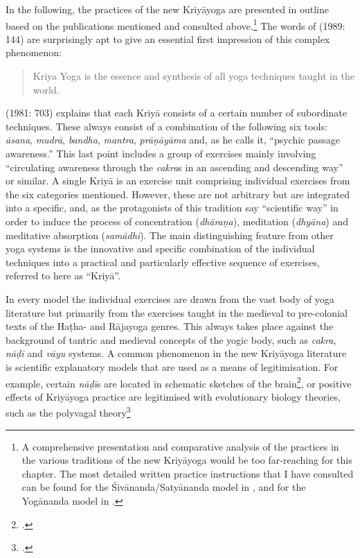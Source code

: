 In the following, the practices of the new Kriyāyoga are presented in outline based on the publications mentioned and consulted above.\footnote{A comprehensive presentation and comparative analysis of the practices in the various traditions of the new Kriyāyoga would be too far-reaching for this chapter. The most detailed written practice instructions that I have consulted can be found for the Śivānanda/Satyānanda model in \citeauthor[1981: 697-952]{kriyayogasarasvati1981}, and for the Yogānanda model in \citeauthor[2013: 249-340]{kriyayoganityananda2013}.} The words of \citeauthor{hariharananda1989} (1989: 144) are surprisingly apt to give an essential first impression of this complex phenomenon: \begin{quote} Kriya Yoga is the essence and synthesis of all yoga techniques taught in the world.  \end{quote} 
\citeauthor{kriyayogasarasvati1981} (1981: 703) explains that each Kriyā consists of a certain number of subordinate techniques. These always consist of a combination of the following six tools: \textit{āsana}, \textit{mudrā}, \textit{bandha}, \textit{mantra}, \textit{prāṇāyāma} and, as he calls it, ``psychic passage awareness.'' This last point includes a group of exercises mainly involving ``circulating awareness through the \textit{cakra}s in an ascending and descending way'' or similar. A single Kriyā is an exercise unit comprising individual exercises from the six categories mentioned. However, these are not arbitrary but are integrated into a specific, and, as the protagonists of this tradition say ``scientific way'' in order to induce the process of concentration (\textit{dhāraṇa}), meditation (\textit{dhyāna}) and meditative absorption (\textit{samādhi}). The main distinguishing feature from other yoga systems is the innovative and specific combination of the individual techniques into a practical and particularly effective sequence of exercises, referred to here as ``Kriyā''.

In every model the individual exercises are drawn from the vast body of yoga literature but primarily from the exercises taught in the medieval to pre-colonial texts of the Haṭha- and Rājayoga genres. This always takes place against the background of tantric and medieval concepts of the yogic body, such as \textit{cakra}, \textit{nāḍī} and \textit{vāyu} systems. A common phenomenon in the new Kriyāyoga literature is scientific explanatory models that are used as a means of legitimisation. For example, certain \textit{nāḍī}s are located in schematic sketches of the brain\footnote{\citeauthor[2013: 215]{kriyayoganityananda2013}.}, or positive effects of Kriyāyoga practice are legitimised with evolutionary biology theories, such as the polyvagal theory\footnote{\citeauthor[2021: 188]{kriyayogalowenstein}.}

